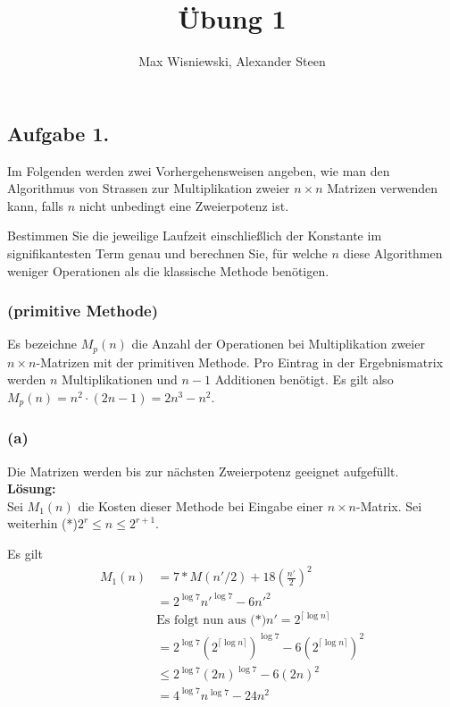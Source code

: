 \documentclass[11pt,a4paper,ngerman]{article}
\date{}
\title{Übung 1}
\author{Max Wisniewski, Alexander Steen}
\begin{document}

\renewcommand{\figurename}{Figure}

\maketitle
\thispagestyle{fancy}

\subsection*{Aufgabe 1.}

Im Folgenden werden zwei Vorhergehensweisen angeben, wie man den Algorithmus
von Strassen zur Multiplikation zweier $n \times n$ Matrizen verwenden kann, falls
$n$ nicht unbedingt eine Zweierpotenz ist.

Bestimmen Sie die jeweilige Laufzeit einschließlich der Konstante im signifikantesten
Term genau und berechnen Sie, für welche $n$ diese Algorithmen weniger Operationen als
die klassische Methode benötigen.

\subsubsection*{(primitive Methode)}
Es bezeichne $M_p(n)$ die Anzahl der Operationen bei Multiplikation zweier $n \times n$-Matrizen
mit der primitiven Methode. Pro Eintrag in der Ergebnismatrix werden $n$ Multiplikationen
und $n-1$ Additionen benötigt. Es gilt also $M_p(n) = n^2 \cdot (2n-1) = 2n^3-n^2$.

\subsubsection*{(a)}

Die Matrizen werden bis zur nächsten Zweierpotenz geeignet aufgefüllt.\\

\textbf{Lösung:}\\
Sei $M_1(n)$ die Kosten dieser Methode bei Eingabe einer $n \times n$-Matrix.
Sei weiterhin (*)$2^r \leq n \leq 2^{r+1}$.
 

Es gilt
\begin{equation*}\begin{split}
M_1(n) &= 7*M(n'/2) + 18 \left(\frac{n'}{2}\right)^2 \\
       & = 2^{\log 7} n'^{\log 7} - 6n'^2\\
       &\text{Es folgt nun aus (*)}n'=2^{\lceil \log n \rceil}\\
       &= 2^{\log 7} (2^{\lceil \log n \rceil})^{\log 7} - 6(2^{\lceil \log n \rceil})^2\\
       &\leq 2^{\log 7} (2n)^{\log 7} - 6 (2n)^2\\
       &= 4^{\log 7}n^{\log 7} - 24n^2
\end{split}\end{equation*}
\end{document}
